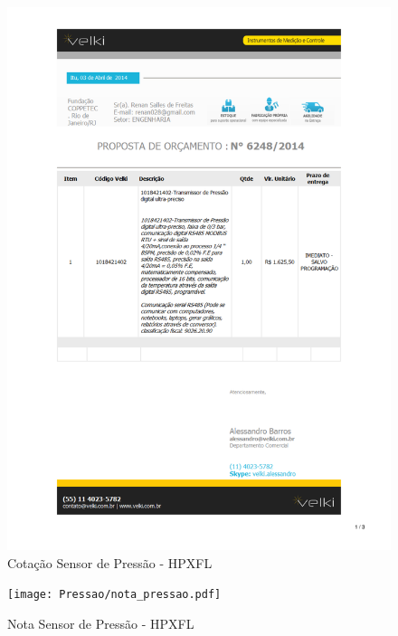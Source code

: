\begin{figure}[h!]
 \centering
 \includegraphics[width=1\columnwidth]{Pressao/price_quote.pdf}
 \caption{Cotação Sensor de Pressão - HPXFL }
\end{figure}

\begin{figure}[h!]
 \centering
 \texttt{[image: Pressao/nota\_pressao.pdf]}
 \caption{Nota Sensor de Pressão - HPXFL}
 \end{figure}